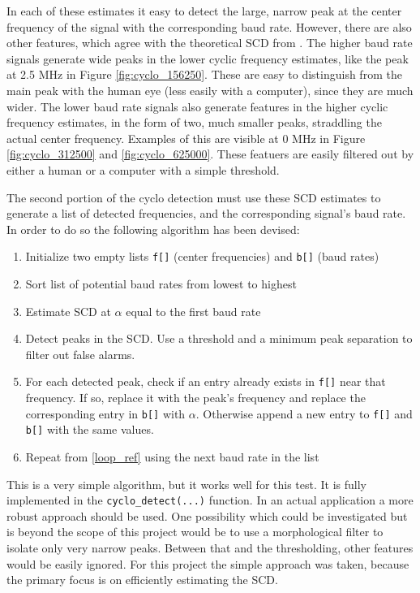 \documentclass[12pt]{report}
\begin{document}
In each of these estimates it easy to detect the large, narrow peak at the
center frequency of the signal with the corresponding baud rate. However, there
are also other features, which agree with the theoretical SCD from
\cite{Gardner2}.  The higher baud rate signals generate wide peaks in the lower
cyclic frequency estimates, like the peak at 2.5 MHz in Figure
\ref{fig:cyclo_156250}. These are easy to distinguish from the main peak with
the human eye (less easily with a computer), since they are much wider. The
lower baud rate signals also generate features in the higher cyclic frequency
estimates, in the form of two, much smaller peaks, straddling the actual center
frequency. Examples of this are visible at 0 MHz in Figure
\ref{fig:cyclo_312500} and \ref{fig:cyclo_625000}. These featuers are easily
filtered out by either a human or a computer with a simple threshold.

The second portion of the cyclo detection must use these SCD estimates to 
generate a list of detected frequencies, and the corresponding signal's
baud rate. In order to do so the following algorithm has been devised:

\begin{enumerate}
    \item Initialize two empty lists \texttt{f[]} (center frequencies) and \texttt{b[]} (baud rates)
    \item Sort list of potential baud rates from lowest to highest
    \item Estimate SCD at $\alpha$ equal to the first baud rate
    \label{loop_ref}
    \item Detect peaks in the SCD. Use a threshold and a minimum peak separation
        to filter out false alarms.
    \item For each detected peak, check if an entry already exists in
        \texttt{f[]} near that frequency. If so, replace it with the peak's
        frequency and replace the corresponding entry in \texttt{b[]} with
        $\alpha$. Otherwise append a new entry to \texttt{f[]} and
        \texttt{b[]} with the same values.
    \item Repeat from \ref{loop_ref} using the next baud rate in the list
\end{enumerate}

This is a very simple algorithm, but it works well for this test. It is
fully implemented in the \texttt{cyclo\_detect(...)} function. In an actual
application a more robust approach should be used. One possibility which could
be investigated but is beyond the scope of this project would be to use
a morphological filter to isolate only very narrow peaks. Between that and the
thresholding, other features would be easily ignored. For this project the
simple approach was taken, because the primary focus is on efficiently
estimating the SCD.
\end{document}
